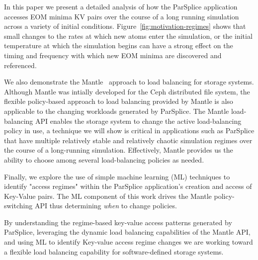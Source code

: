 In this paper we present a detailed analysis of how the ParSplice application
accesses EOM minima KV pairs over the course of a long running simulation
across a variety of initial conditions. Figure~\ref{fig:motivation-regimes}
shows that small changes to the rates at which new atoms enter the simulation,
or the initial temperature at which the simulation begins can have a strong
effect on the timing and frequency with which new EOM minima are discovered and
referenced.

We also demonstrate the Mantle~\cite{sevilla:sc15-mantle} approach to load
balancing for storage systems.  Although Mantle was intially developed for the
Ceph distributed file system, the flexible policy-based approach to load
balancing provided by Mantle is also applicable to the changing workloads
generated by ParSplice. The Mantle load-balancing API enables the storage
system to change the active load-balancing policy in use, a technique we will
show is critical in applications such as ParSplice that have multiple
relatively stable and relatively chaotic simulation regimes over the course of
a long-running simulation. Effectively, Mantle provides us the ability to
choose among several load-balancing policies as needed.

Finally, we explore the use of simple machine learning (ML) techniques to
identify "access regimes" within the ParSplice application's creation and
access of Key-Value pairs. The ML component of this work drives the Mantle
policy-switching API thus determining \emph{when} to change policies.

By understanding the regime-based key-value access patterns generated by
ParSplice, leveraging the dynamic load balancing capabilities of the Mantle
API, and using ML to identify Key-value access regime changes we are working
toward a flexible load balancing capability for software-defined storage
systems. 




